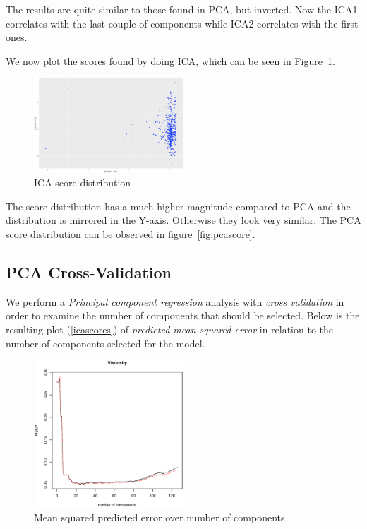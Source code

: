 \documentclass[a4paper, twocolumn]{article}
\begin{document}
        The results are quite similar to those found in PCA, but inverted. Now the ICA1 correlates with the last couple of components while ICA2 correlates with the first ones.

        We now plot the scores found by doing ICA, which can be seen in Figure~\ref{fig:icascores}.

        \begin{figure}[h!]
            \centering
            \caption{ICA score distribution}
            \label{fig:icascores}
            \includegraphics[width=0.5\textwidth]{share/A2_icascore.eps}
        \end{figure}

        The score distribution has a much higher magnitude compared to PCA and the distribution is mirrored in the Y-axis. Otherwise they look very similar. The PCA score distribution can be observed in figure~\ref{fig:pcascore}.
    \subsection*{PCA Cross-Validation}

 		We perform a \emph{Principal component regression} analysis with \emph{cross validation} in order to examine the number of components that should be selected. Below is the resulting plot (\ref{icascores}) of \emph{predicted mean-squared error} in relation to the number of components selected for the model.

        \begin{figure}[h!]
            \centering
            \caption{Mean squared predicted error over number of components}
            \label{fig:viscosity}
            \includegraphics[width=0.5\textwidth]{share/A2_viscosity.eps}
        \end{figure}
\end{document}
